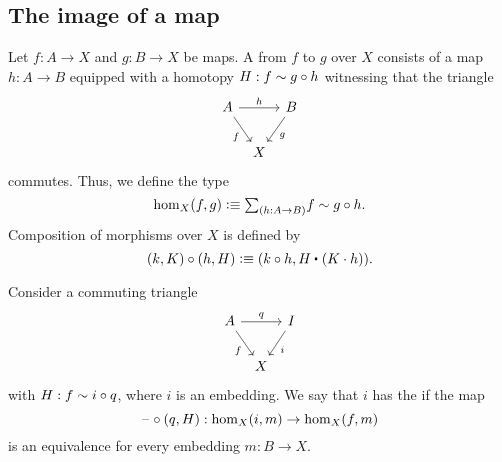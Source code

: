 \subsection{The image of a map}\label{sec:image-construction}

\begin{defn}
  Let $f:A\to X$ and $g:B\to X$ be maps. A  from $f$ to $g$ over $X$ consists of a map $h:A\to B$ equipped with a homotopy $H:f\sim g\circ h$ witnessing that the triangle
\begin{equation*}
\begin{tikzcd}[column sep=tiny]
A \arrow[rr,"h"] \arrow[dr,swap,"f"] & & B \arrow[dl,"g"] \\
& X
\end{tikzcd}
\end{equation*}
commutes. Thus, we define the type
\begin{equation*}
\mathrm{hom}_X(f,g)\defeq\sm{h:A\to B}f\htpy g\circ h.
\end{equation*}
Composition of morphisms over $X$ is defined by
\begin{equation*}
  (k,K)\circ (h,H) \defeq (k\circ h,\ct{H}{(K\cdot h)}).
\end{equation*}
\end{defn}

\begin{defn}
Consider a commuting triangle
\begin{equation*}
\begin{tikzcd}[column sep=tiny]
A \arrow[rr,"q"] \arrow[dr,swap,"f"] & & I \arrow[dl,"i"] \\
& X
\end{tikzcd}
\end{equation*}
with $H:f\sim i\circ q$, where $i$ is an embedding.
We say that $i$ has the  if the map
\begin{equation*}
\mathord{\hspace{1pt}\text{--}\hspace{1pt}}\circ(q,H) : \mathrm{hom}_X(i,m)\to\mathrm{hom}_X(f,m)
\end{equation*}
is an equivalence for every embedding $m:B\to X$. 
\end{defn}

